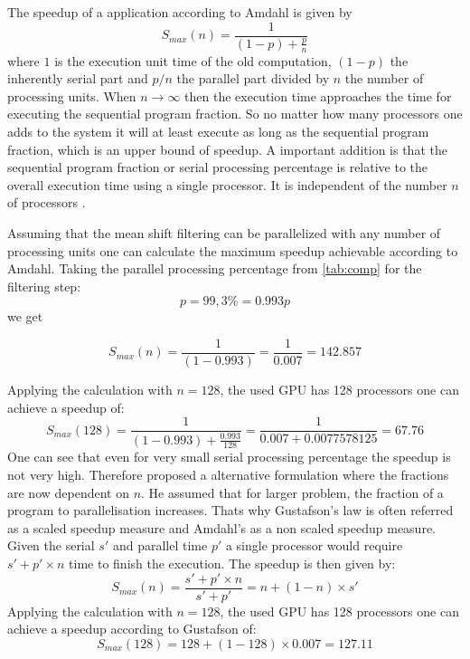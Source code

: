 The speedup of a application according to Amdahl is given by
\begin{equation}\label{eq:amdahl}
  S_{max}(n) = \frac{1}{(1-p) + \frac{p}{n}}
\end{equation} 
where $1$ is the execution unit time of the old computation, $(1-p)$
the inherently serial part and $p/n$ the parallel part divided by $n$
the number of processing units. When $n \rightarrow \infty$ then the
execution time approaches the time for executing the sequential
program fraction. So no matter how many processors one adds to the
system it will at least execute as long as the sequential program
fraction, which is an upper bound of speedup. A important addition is
that the sequential program fraction or serial processing percentage
is relative to the overall execution time using a single processor. It
is independent of the number $n$ of processors
\citeauthor{citeulike:3838998} \citep{citeulike:3838998}.

Assuming that the mean shift filtering can be parallelized with any number of
processing units one can calculate the maximum speedup achievable according to
Amdahl. Taking the parallel processing percentage from \autoref{tab:comp} for
the filtering step:
\begin{equation*}\label{eq:parallel}
  p = 99,3\% = 0.993 
  p\end{equation*}
we get

\begin{equation*}\label{eq:am0}
  S_{max}(n) = \frac{1}{(1-0.993)} = \frac{1}{0.007} = 142.857	
\end{equation*}

Applying the calculation with $n = 128$, the used \gls{GPU} has 128
processors one can achieve a speedup of:
\begin{equation*}\label{eq:g92sp}
  S_{max}(128) = \frac{1}{(1-0.993) + \frac{0.993}{128}} = \frac{1}{0.007 + 0.0077578125} = 67.76
\end{equation*}
One can see that even for very small serial processing percentage the speedup is
not very high. Therefore \citeauthor{citeulike:3732921} proposed a alternative
formulation where the fractions are now dependent on $n$. He assumed that for
larger problem, the fraction of a program to parallelisation increases. Thats
why Gustafson's law is often referred as a scaled speedup measure and Amdahl's
as a non scaled speedup measure. Given the serial $s'$ and parallel time $p'$ a
single processor would require $s' + p' \times n$ time to finish the execution.
The speedup is then given by:
\begin{equation}\label{eq:gus}
  S_{max}(n) = \frac{s' + p' \times n}{s' + p'} = n + ( 1 - n ) \times s'
\end{equation}
Applying the calculation with $n = 128$, the used \gls{GPU} has 128 processors
one can achieve a speedup according to Gustafson of:
\begin{equation*}\label{eq:g92sp}
  S_{max}(128) = 128 + (1 - 128) \times 0.007 = 127.11
\end{equation*}


